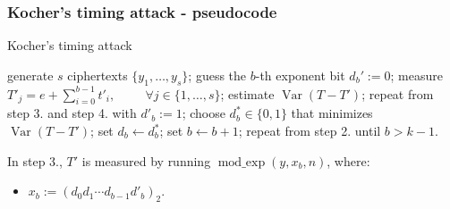 \documentclass{beamer}
\DeclareMathOperator{\Var}{Var}
\DeclareMathOperator{\modexp}{mod\_exp}
\begin{document}
\begin{frame}
\frametitle{Kocher's timing attack - pseudocode}

\begin{algorithm}[H]
\caption{Kocher's timing attack}\label{alg:two}
\begin{algorithmic}[1]
  \State generate $s$ ciphertexts $\{ y_1, \dots, y_s \}$;
  \State guess the $b$-th exponent bit $d_b' := 0$;
  \State measure $T'_j = e + \sum_{i = 0}^{b - 1} t'_i, \hspace{1cm} \forall j \in \{ 1, \dots, s\}$;
  \State estimate $\Var(T - T')$;
  \State repeat from step 3. and step 4. with $d'_b := 1$;
  \State choose $d^*_b \in \{0, 1\}$ that minimizes $\Var(T - T')$;
  \State set $d_b \leftarrow d^*_b$;
  \State set $b \leftarrow b + 1$;
  \State repeat from step 2. until $b > k - 1$.
\end{algorithmic}
\end{algorithm}

In step 3., $T'$ is measured by running $\modexp(y, x_b, n)$, where:
\begin{itemize}
  \item $x_b := (d_0 d_1 \cdots d_{b-1} d'_b)_2$.
\end{itemize}

\end{frame}
%
%
\end{document}
